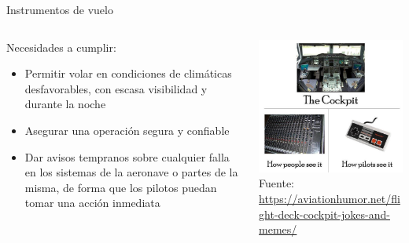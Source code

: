 \begin{frame}{Instrumentos de vuelo}
\begin{columns}{2}
\begin{column}{0.5\textwidth}
{  \begin{block}{    Necesidades a cumplir:}
    \begin{itemize}
    \item Permitir volar en condiciones de clim\'aticas desfavorables, 
	con escasa visibilidad y durante la noche
    \item Asegurar una operaci\'on segura y confiable
    \item Dar avisos tempranos sobre cualquier falla en los sistemas
      de la aeronave o partes de la misma, de forma que los pilotos
      puedan tomar una acci\'on inmediata
    \end{itemize}
  \end{block}
}
\end{column}
    \begin{column}{0.5\textwidth} \centering
 \includegraphics[width=\linewidth]{imagenes/1.1.introduccion/TheCockpit.jpg} \\
{\tiny Fuente: \url{https://aviationhumor.net/flight-deck-cockpit-jokes-and-memes/}}
    \end{column}
  \end{columns}

\end{frame}

